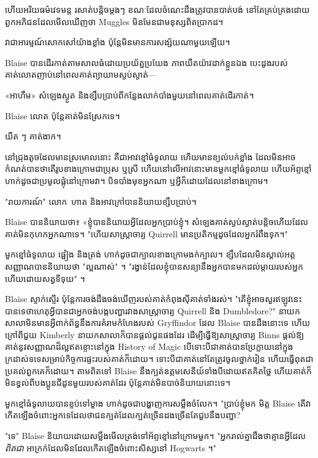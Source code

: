 ហើយអរិយធម៌វេទមន្ត រសាត់បន្តិចម្តងៗ ខណៈដែលចំណេះដឹងត្រូវបានបាត់បង់ នៅតែគ្រប់គ្រងដោយពួកអភិជនដែលមើលឃើញថា Muggles មិនមែនជាមនុស្សពិតប្រាកដ។

វា​ជា​អារម្មណ៍​សោកសៅ​យ៉ាង​ខ្លាំង ប៉ុន្តែ​មិន​មាន​ការ​សង្ស័យ​ណាមួយ​ឡើយ។


Blaise បានដើរកាត់តាមសាលធំដោយប្រយ័ត្នប្រយែង ភាពយឺតយ៉ាវដាក់ខ្លួនឯង បេះដូងរបស់គាត់លោតញាប់នៅពេលគាត់ព្យាយាមស្ងប់ស្ងាត់—

«អាហឹម» សំឡេងស្ងួត និងខ្សឹបប្រាប់ពីកន្លែងលាក់បាំងមួយនៅពេលគាត់ដើរកាត់។

Blaise លោត ប៉ុន្តែគាត់មិនស្រែកទេ។

យឺត ៗ គាត់ងាក។

នៅជ្រុងតូចដែលមានស្រមោលនោះ គឺជាអាវខ្មៅធំទូលាយ ហើយមានខ្យល់បក់ខ្លាំង ដែលមិនអាចកំណត់បានថាតើរូបខាងក្រោមជាប្រុស ឬស្រី ហើយនៅលើអាវនោះមានមួកខ្មៅធំទូលាយ ហើយអ័ព្ទខ្មៅហាក់ដូចជាប្រមូលផ្តុំនៅក្រោមវា។ បិទបាំងមុខអ្នកណា ឬអ្វីក៏ដោយដែលនៅខាងក្រោម។

"រាយការណ៍" លោក~ហាត និងអាវក្រៅបាននិយាយខ្សឹបប្រាប់។

Blaise បាន​និយាយ​ថា​៖ «​ខ្ញុំ​បាន​និយាយ​អ្វី​ដែល​អ្នក​ប្រាប់​ខ្ញុំ​។ សំឡេង​គាត់​ស្ងប់ស្ងាត់​បន្តិច​ហើយ​ដែល​គាត់​មិន​កុហក​អ្នក​ណា​ទេ។ "ហើយសាស្រ្តាចារ្យ Quirrell មានប្រតិកម្មដូចដែលអ្នករំពឹងទុក។"

មួកខ្មៅធំទូលាយ ផ្អៀង និងត្រង់ ហាក់ដូចជាក្បាលខាងក្រោមងក់ក្បាល។ ខ្សឹបដែលមិនស្គាល់អត្តសញ្ញាណបាននិយាយថា "ល្អណាស់" ។ "រង្វាន់ដែលខ្ញុំបានសន្យានឹងអ្នកបានមកដល់ម្តាយរបស់អ្នកហើយដោយសត្វទីទុយ" ។

Blaise ស្ទាក់ស្ទើរ ប៉ុន្តែការចង់ដឹងចង់ឃើញរបស់គាត់កំពុងស៊ីគាត់ទាំងរស់។ "តើខ្ញុំអាចសួរឥឡូវនេះបានទេថាហេតុអ្វីបានជាអ្នកចង់បង្កបញ្ហារវាងសាស្រ្តាចារ្យ Quirrell និង Dumbledore?" នាយកសាលាមិនមានអ្វីពាក់ព័ន្ធនឹងការគំរាមកំហែងរបស់ Gryffindor ដែល Blaise បានដឹងនោះទេ ហើយក្រៅពីជួយ Kimberly នាយកសាលាក៏បានផ្តល់ជូនផងដែរ ដើម្បីធ្វើឱ្យសាស្រ្តាចារ្យ Binns ផ្តល់ឱ្យគាត់នូវសញ្ញាណដ៏ល្អឥតខ្ចោះនៅក្នុង History of Magic បើទោះបីជាគាត់បានប្រែក្លាយនៅក្នុងក្រដាស់ទទេសម្រាប់កិច្ចការផ្ទះរបស់គាត់ក៏ដោយ។ ទោះបីជាគាត់នៅតែត្រូវចូលថ្នាក់រៀន ហើយធ្វើពុតជាប្រគល់ពួកគេក៏ដោយ។ តាមពិតទៅ Blaise នឹងក្បត់ឧត្តមសេនីយ៍ទាំងបីដោយឥតគិតថ្លៃ ហើយគាត់ក៏មិនខ្វល់ពីបងប្អូនជីដូនមួយរបស់គាត់ដែរ ប៉ុន្តែគាត់មិនបាច់និយាយនោះទេ។

មួកខ្មៅធំទូលាយបានខ្ទប់ទៅម្ខាង ហាក់ដូចជាបង្ហាញការសម្លឹងចំលែក។ "ប្រាប់ខ្ញុំមក មិត្ត Blaise តើវាកើតឡើងចំពោះអ្នកទេដែលថាជនក្បត់ដែលក្បត់ច្រើនដងច្រើនតែជួបនឹងបញ្ហា?

"ទេ" Blaise និយាយដោយសម្លឹងមើលត្រង់ទៅអ័ព្ទខ្មៅនៅក្រោមមួក។ "អ្នក​រាល់​គ្នា​ដឹង​ថា​គ្មាន​អ្វី​ដែល \emph{ពិតជា} អាក្រក់​ដែល​មិន​ដែល​កើត​ឡើង​ចំពោះ​សិស្ស​នៅ Hogwarts ។"

